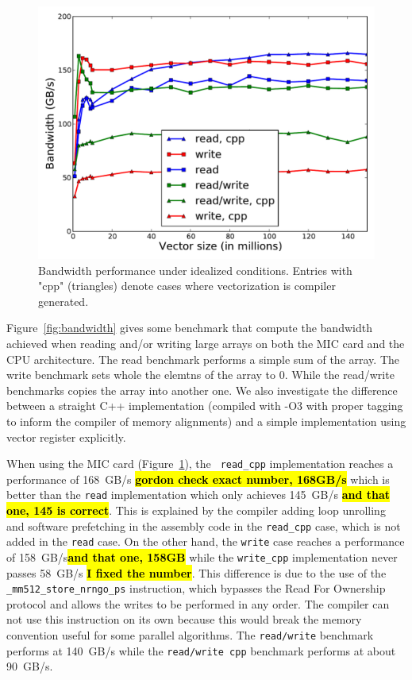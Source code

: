 \documentclass[10pt,conference,compsocconf]{IEEEtran}
\newcommand{\todo}[1]{{\color{red}\textbf{\hl{#1}}\xspace}}
\begin{document}
\begin{figure}[bth]
  \centering
  \includegraphics[width=.9\linewidth]{figures/bandwidth_read_write.pdf}
  
  \caption{Bandwidth performance under idealized conditions.  Entries
    with "cpp" (triangles) denote cases where vectorization is
    compiler generated.}
  \label{fig:bandwidth}
  \label{fig:band_rw_MIC}
\end{figure}

Figure~\ref{fig:bandwidth} gives some benchmark that compute the
bandwidth achieved when reading and/or writing large arrays on both
the MIC card and the CPU architecture. The read benchmark performs a
simple sum of the array. The write benchmark sets whole the elemtns of
the array to 0. While the read/write benchmarks copies the array into
another one. We also investigate the difference between a straight C++
implementation (compiled with -O3 with proper tagging to inform the
compiler of memory alignments) and a simple implementation using
vector register explicitly.

When using the MIC card (Figure~\ref{fig:band_rw_MIC}), the {\tt
  read\_cpp} implementation reaches a performance of 168~GB/s
\todo{gordon check exact number, 168GB/s} which is better than the {\tt read}
implementation which only achieves 145~GB/s \todo{and that one, 145 is correct}. This
is explained by the compiler adding loop unrolling and software
prefetching in the assembly code in the {\tt read\_cpp} case, which is
not added in the {\tt read} case. On the other hand, the {\tt write}
case reaches a performance of 158~GB/s\todo{and that one, 158GB} while the
{\tt write\_cpp} implementation never passes 58~GB/s \todo{I fixed the number}. 
This difference is due to the use of the {\tt \_mm512\_store\_nrngo\_ps} instruction, 
which bypasses the Read For Ownership protocol and allows the writes
to be performed in any order. The compiler can not use this
instruction on its own because this would break the memory convention
useful for some parallel algorithms. The {\tt read/write} benchmark
performs at 140~GB/s while the {\tt read/write cpp} benchmark performs
at about 90~GB/s.
\end{document}
